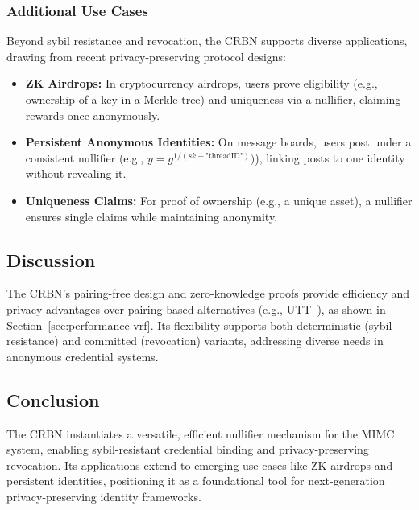 \subsubsection{Additional Use Cases}\label{subsubsec:other-applications}
Beyond sybil resistance and revocation, the CRBN supports diverse applications, drawing from recent privacy-preserving protocol designs:

\begin{itemize}
    \item \textbf{ZK Airdrops:} In cryptocurrency airdrops, users prove eligibility (e.g., ownership of a key in a Merkle tree) and uniqueness via a nullifier, claiming rewards once anonymously.
    \item \textbf{Persistent Anonymous Identities:} On message boards, users post under a consistent nullifier (e.g., $y = g^{1/(sk + \text{"threadID"})})$), linking posts to one identity without revealing it.
    \item \textbf{Uniqueness Claims:} For proof of ownership (e.g., a unique asset), a nullifier ensures single claims while maintaining anonymity.
\end{itemize}

\subsection{Discussion}
The CRBN’s pairing-free design and zero-knowledge proofs provide efficiency and privacy advantages over pairing-based alternatives (e.g., UTT~\cite{tomescu2022utt}), as shown in Section~\ref{sec:performance-vrf}. Its flexibility supports both deterministic (sybil resistance) and committed (revocation) variants, addressing diverse needs in anonymous credential systems.

\subsection{Conclusion}
The CRBN instantiates a versatile, efficient nullifier mechanism for the MIMC system, enabling sybil-resistant credential binding and privacy-preserving revocation. Its applications extend to emerging use cases like ZK airdrops and persistent identities, positioning it as a foundational tool for next-generation privacy-preserving identity frameworks.


